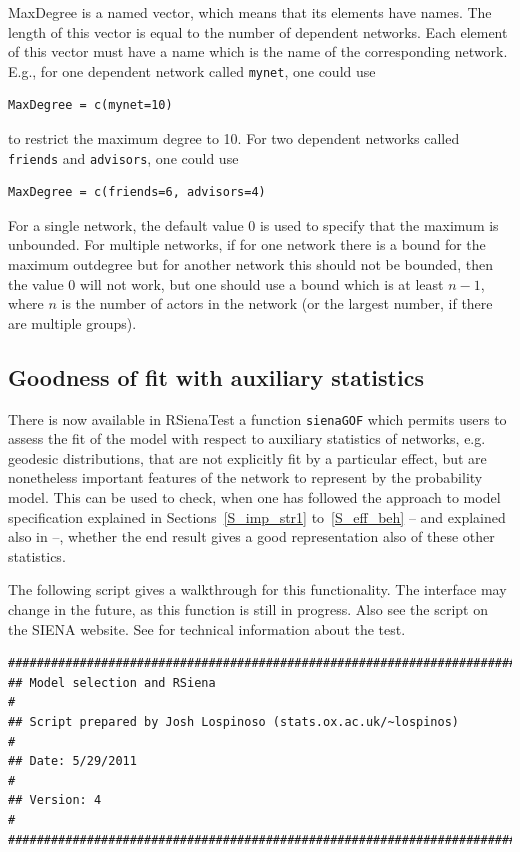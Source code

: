 \documentclass[a4paper,fleqn,11pt]{article}
\newcommand{\+}{\, + \,}
\newcommand{\SI}{{\sf SIENA }}
\begin{document}
{\textsf{MaxDegree} is a named vector, which means that its elements
have names. The length of this vector
is equal to the number of dependent networks.
Each element of this vector must have a name
which is the name of the corresponding network.
E.g., for one dependent network called \texttt{mynet}, one could use
\begin{verbatim}
MaxDegree = c(mynet=10)
\end{verbatim}
to restrict the maximum degree to 10.
For two dependent networks called \texttt{friends} and \texttt{advisors},
one could use
\begin{verbatim}
MaxDegree = c(friends=6, advisors=4)
\end{verbatim}

For a single network, the default value 0 is used
to specify that the maximum is unbounded.
For multiple networks, if for one network
there is a bound for the maximum outdegree
 but for another network this should not be bounded, then
 the value 0 will not work,
 but one should use a bound which is at least $n-1$,
where $n$ is the number of actors in the network (or the largest number,
if there are multiple groups).

\subsection{Goodness of fit with auxiliary statistics}
\label{S_gof}

There is now available in RSienaTest a function \verb!sienaGOF!
which permits users to assess the fit of the model with respect to
auxiliary statistics of networks,
e.g. geodesic distributions,
that are not explicitly fit by a particular effect,
but are nonetheless important features of the network to represent by the
probability model.
This can be used to check, when one has followed the approach to
model specification explained in Sections~\ref{S_imp_str1}
to~\ref{S_eff_beh} -- and explained also in \citet{SnijdersEA10b} --,
whether the end result gives a good representation
also of these other statistics.

The following script gives a walkthrough for this functionality. The interface
may change in the future, as this function is still in progress.
Also see the script on the \SI website.
See \citet{Lospinoso2011b} for technical information about the test.

\begin{footnotesize}
\begin{verbatim}
################################################################################
## Model selection and RSiena								                   #
## Script prepared by Josh Lospinoso (stats.ox.ac.uk/~lospinos)                #
## Date: 5/29/2011											                   #
## Version: 4												                   #
################################################################################


\end{verbatim}
\end{footnotesize}}
\end{document}
